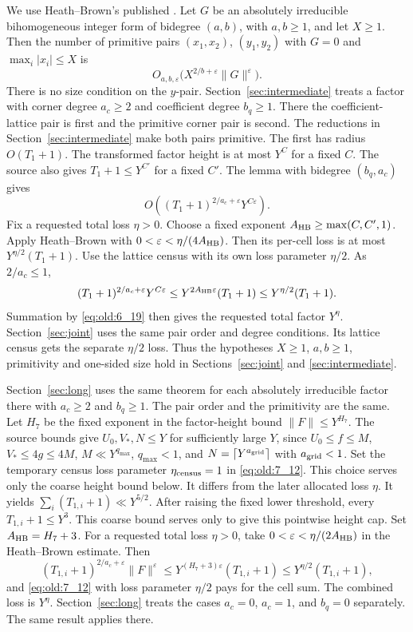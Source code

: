 We use Heath--Brown's published \cite[Lemma~2, p.~8]{HB2012}.
Let \(G\) be an absolutely irreducible
bihomogeneous integer form of bidegree \((a,b)\), with \(a,b\ge1\), and
let \(X\ge1\). Then the number of primitive pairs \((x_1,x_2)\),
\((y_1,y_2)\) with \(G=0\) and \(\max_i|x_i|\le X\) is
\[
 O_{a,b,\varepsilon}\bigl(X^{2/b+\varepsilon}\|G\|^\varepsilon\bigr).
\]
There is no size condition on the \(y\)-pair. Section~\ref{sec:intermediate} treats a factor
with corner degree \(a_c\ge2\) and coefficient degree \(b_q\ge1\).
There the coefficient-lattice pair is first and the primitive corner pair is
second. The reductions in Section~\ref{sec:intermediate} make both pairs primitive. The
first has radius \(O(T_1+1)\). The transformed factor height is at
most \(Y^C\) for a fixed \(C\). The source also gives \(T_1+1\le Y^{C'}\)
for a fixed \(C'\). The lemma with bidegree \((b_q,a_c)\) gives
\[
 O((T_1+1)^{2/a_c+\varepsilon}Y^{C\varepsilon}).
\]
Fix a requested total loss \(\eta>0\). Choose a fixed exponent
\(A_{\rm HB}\ge\max(C,C',1)\). Apply Heath--Brown with
\(0<\varepsilon<\eta/(4A_{\rm HB})\). Then its per-cell loss is at most
\(Y^{\eta/2}(T_1+1)\). Use the lattice census with its own loss
parameter \(\eta/2\). As \(2/a_c\le1\),
\[
 (T_1+1)^{2/a_c+\varepsilon}Y^{C\varepsilon}
 \le Y^{2A_{\rm HB}\varepsilon}(T_1+1)
\le Y^{\eta/2}(T_1+1).
\]
Summation by \eqref{eq:old:6_19} then gives the requested total
factor \(Y^\eta\). Section~\ref{sec:joint} uses the same pair order and degree
conditions. Its lattice census gets the separate \(\eta/2\) loss.
Thus the hypotheses \(X\ge1\), \(a,b\ge1\), primitivity and one-sided
size hold in Sections~\ref{sec:joint} and \ref{sec:intermediate}.

Section~\ref{sec:long} uses the same theorem for each absolutely irreducible factor
there with \(a_c\ge2\) and \(b_q\ge1\). The pair order and the
primitivity are the same. Let \(H_7\) be the fixed exponent in the factor-height
bound \(\lVert F\rVert\le Y^{H_7}\). The source bounds give
\(U_0,V_*,N\le Y\) for sufficiently large \(Y\), since
\(U_0\le f\le M\), \(V_*\le4g\le4M\),
\(M\ll Y^{q_{\max}}\), \(q_{\max}<1\), and \(N=\lceil Y^{a_{\rm grid}}\rceil\)
with \(a_{\rm grid}<1\). Set the temporary census loss parameter
\(\eta_{\rm census}=1\) in \eqref{eq:old:7_12}. This choice serves only
the coarse height bound below. It differs from the later allocated
loss \(\eta\). It yields
\(\sum_i(T_{1,i}+1)\ll Y^{5/2}\). After raising the fixed lower
threshold, every \(T_{1,i}+1\le Y^3\). This coarse bound serves only to
give this pointwise height cap. Set
\(A_{\rm HB}=H_7+3\). For a
requested total loss \(\eta>0\), take
\(0<\varepsilon<\eta/(2A_{\rm HB})\) in the Heath--Brown estimate. Then
\[
 (T_{1,i}+1)^{2/a_c+\varepsilon}\lVert F\rVert^\varepsilon
 \le Y^{(H_7+3)\varepsilon}(T_{1,i}+1)
 \le Y^{\eta/2}(T_{1,i}+1),
\]
and \eqref{eq:old:7_12} with loss parameter \(\eta/2\) pays for
the cell sum. The combined loss is \(Y^\eta\). Section~\ref{sec:long} treats the
cases \(a_c=0\), \(a_c=1\), and \(b_q=0\) separately. The same result
applies there.

